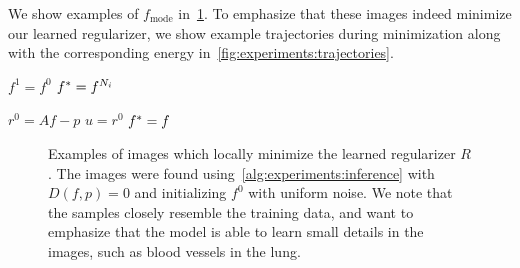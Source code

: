 \documentclass[../ml-ct.tex]{subfiles}
\begin{document}
We show examples of \( f_\text{mode} \) in~\cref{fig:experiments:modes}.
To emphasize that these images indeed minimize our learned regularizer, we show example trajectories during minimization along with the corresponding energy in~\cref{fig:experiments:trajectories}.
\begin{algorithm}[t]
	\DontPrintSemicolon%
	\( f^1 = f^0 \)\;
	\( f^*_{\text{}} = f^{N_i} \)
	\caption{%
		Accelerated Proximal Gradient Descent for minimizing an energy functional.
	}%
	\label{alg:experiments:inference}
\end{algorithm}
\begin{algorithm}[t]
	\DontPrintSemicolon%
	\( r^0 = Af - p \)\;
	\( u = r^0 \)\;
	\( f^*_{\text{}} = f \)
	\caption{%
		Conjugate Gradient Method to solve \( Af = p \).
	}%
	\label{alg:experiments:cg}
\end{algorithm}
\begin{figure}
	\centering
	\caption[Examples of images which locally minimize the learned regularizer \( R \).]{%
		Examples of images which locally minimize the learned regularizer \( R \).
		The images were found using~\cref{alg:experiments:inference} with \( D(f, p) = 0 \) and initializing \( f^0 \) with uniform noise.
		We note that the samples closely resemble the training data, and want to emphasize that the model is able to learn small details in the images, such as blood vessels in the lung.
	}%
	\label{fig:experiments:modes}
\end{figure}
\end{document}
